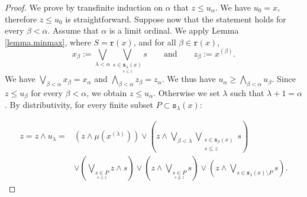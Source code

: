\documentclass[10pt,a4paper]{amsart}
\begin{document}
\begin{proof}
{We prove by transfinite induction on \(\alpha\) that \(z\leq u_\alpha\). We have $u_0 = x$, therefore $z \le u_{0}$ is straightforward. Suppose now that the statement holds for every \(\beta<\alpha\). Assume that \(\alpha\) is a limit ordinal. We apply Lemma \ref{lemma.minmax}, where $S = \texttt{r}(x)$, and for all $\beta \in \texttt{r}(x)$,
\[x_{\beta} := \bigvee_{\lambda < \alpha} \bigvee_{\underset{s \le z}{s \in \texttt{s}_{\lambda}(x)}}s \qquad \text{and} \qquad z_{\beta} := x^{(\beta)}.\]
We have $\bigvee_{\beta < \alpha} x_{\beta} = x_{\alpha}$ and 
$\bigwedge_{\beta < \alpha} z_{\beta} = z_{\alpha}$.
We thus have \(u_\alpha \ge \bigwedge_{\beta<\alpha}u_\beta\). Since \(z\leq u_\beta\) for every \(\beta<\alpha\), we obtain \(z\le u_\alpha\).} 
Otherwise we set $\lambda$ such that $\lambda + 1 = \alpha$. By distributivity, for every finite subset {$P \subset \texttt{s}_{\lambda}(x)$}:
{
\[
\begin{aligned}
z = z \wedge u_{\lambda}
  ={}&(z \wedge \mu(x^{(\lambda)}))
   \vee \left(z \wedge \bigvee_{\beta < \lambda}
        \bigvee_{\substack{s \in \texttt{s}_{\beta}(x)\\ s \le z}} s\right) \\
   &\vee \left(\bigvee_{\underset{s \le z}{s \in P}} z \wedge s\right) \vee \left(z \wedge\bigvee_{\underset{s \not \le z}{s \in P}} s\right)
   \vee \left(z \wedge \bigvee_{s \in \texttt{s}_{\lambda}(x)\setminus P} s\right).
\end{aligned}
\]

}
\end{proof}
\end{document}
